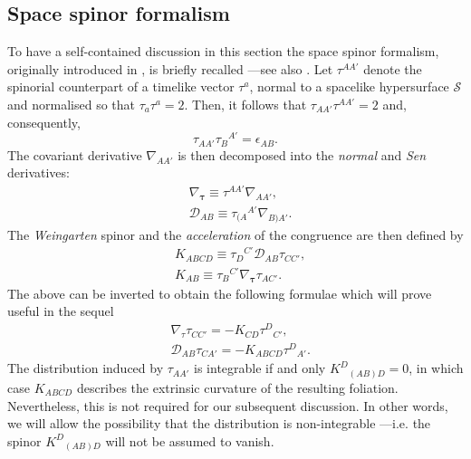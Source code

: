 \documentclass[10pt,a4paper]{article}
\theoremstyle{plain}
\begin{document}
\subsection*{Space spinor formalism}

To have a self-contained discussion in this section the space spinor
formalism, originally introduced in \cite{Som80}, is briefly recalled
---see also \cite{GarVal08c,BaeVal10b,CFEbook}.  Let $\tau^{AA'}$
denote the spinorial counterpart of a timelike vector $\tau^{a}$,
normal to a spacelike hypersurface $\mathcal{S}$ and normalised so
that $\tau_{a}\tau^{a}=2$.  Then, it follows that
$\tau_{AA'}\tau^{AA'}=2$ and, consequently,
\[\tau_{AA'}\tau_B{}^{A'}=\epsilon_{AB}.\]  
The covariant derivative $\nabla_{AA'}$ is then decomposed into the
\emph{normal} and \emph{Sen} derivatives:
\begin{align*}
  &\nabla_{\bm\tau} \equiv \tau^{AA'}\nabla_{AA'},\\ & \mathcal{D}_{AB}\equiv
  \tau_{(A}{}^{A'}\nabla_{B)A'}.
\end{align*}
The \emph{Weingarten} spinor and the \emph{acceleration} of the
congruence are then defined by
\begin{align*}
& K_{ABCD} \equiv \tau_{D}{}^{C'} \mathcal{D}_{AB}\tau_{CC'},\\ &
  K_{AB} \equiv \tau_{B}{}^{C'} \nabla_{\bm\tau}\tau_{AC'}.
\end{align*}
The above can be inverted to obtain the following formulae which will
prove useful in the sequel
\begin{align*}
  & \nabla_\tau \tau_{CC'}=- K_{CD} \tau^{D}{}_{C'},\\ &
  \mathcal{D}_{AB}\tau_{CA'} = - K_{ABCD} \tau^{D}{}_{A'}.
\end{align*}
The distribution induced by $\tau_{AA'}$ is integrable if and only
$K^D{}_{(AB)D}=0$, in which case $K_{ABCD}$ describes the extrinsic
curvature of the resulting foliation.
 Nevertheless, this is not required for our subsequent discussion.
In other words, we will allow
 the possibility that the distribution is non-integrable
---i.e. the spinor $ K^D{}_{(AB)D}$ will not be assumed
to vanish. 

\medskip
\end{document}
